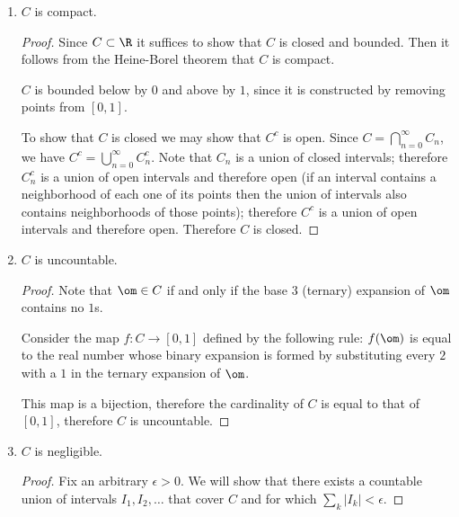 \begin{enumerate}[label=(2.\arabic*)]
\item
  \begin{claim*}
    $C$ is compact.
  \end{claim*}
  \begin{proof}
    Since $C \subset \R$ it suffices to show that $C$ is closed and bounded. Then it follows from the Heine-Borel
    theorem that $C$ is compact.

    $C$ is bounded below by $0$ and above by $1$, since it is constructed by removing points from $[0, 1]$.

    To show that $C$ is closed we may show that $C^c$ is open. Since $C = \bigcap_{n=0}^\infty C_n$, we
    have $C^c = \bigcup_{n=0}^\infty C_n^c$. Note that $C_n$ is a union of closed intervals; therefore $C_n^c$
    is a union of open intervals and therefore open (if an interval contains a neighborhood of each one of its
    points then the union of intervals also contains neighborhoods of those points); therefore $C^c$ is a union
    of open intervals and therefore open. Therefore $C$ is closed.
  \end{proof}

\item
  \begin{claim*}
    $C$ is uncountable.
  \end{claim*}

  \begin{proof}
    Note that $\om \in C$ if and only if the base 3 (ternary) expansion of $\om$ contains no $1$s.

    Consider the map $f:C \to [0, 1]$ defined by the following rule: $f(\om)$ is equal to the real number whose
    binary expansion is formed by substituting every $2$ with a $1$ in the ternary expansion of $\om$.

    This map is a bijection, therefore the cardinality of $C$ is equal to that of $[0, 1]$, therefore $C$ is
    uncountable.
  \end{proof}

\item \begin{claim*}
    $C$ is negligible.
  \end{claim*}

  \begin{proof}
    Fix an arbitrary $\epsilon > 0$. We will show that there exists a countable union of
    intervals $I_1, I_2, \ldots$ that cover $C$ and for which $\sum_k |I_k| < \epsilon$.


\end{proof}
\end{enumerate}

